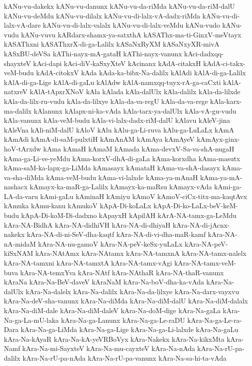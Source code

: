 {kANu-vu-dakekx
kANu-vu-danunx
kANu-vu-da-riMda
kANu-vu-da-riM-dalU
kANu-vu-deMdu
kANu-vu-dilalx
kANu-vu-di-lalx-vA-dadx-riMda
kANu-vu-di-lalx-vA-dare
kANu-vu-di-lalx-valalx
kANu-vu-di-lalx-veMdu
kANu-vudo
kANu-vudu
kANu-vuvu
kARdarx-shamx-ya-satxthA
kASAThx-ma-ti-GinxV-meVtayx
kASAThxni
kASAThxrX-di-ga-Lalilx
kASaNxRyXM
kASaNxyXR-mivA
kASxBU-deVSa
kAThi-nayx-mA-gataH
kAThi-nayx-vanunx
kAci-dadxqq-shayxteV
kAci-dapi
kAci-diV-kaSxyXteV
kAcinanx
kAdA-citakxH
kAdA-ci-takx-veM-budu
kAdA-citokxV
kAda
kAda-ka-bibx-Na-dalilx
kAlAdi
kAlA-di-ga-Lalilx
kAlA-di-ga-Lige
kAlA-di-gaLu
kAlAdw
kAlA-namxqq-tuyx-rA-ga-caCxti
kAlA-natxreV
kAlA-tApxrXNoV
kAla
kAlada
kAla-dalUlx
kAla-dalilx
kAla-da-lilxde
kAla-da-lilx-ru-vudu
kAla-da-lilxye
kAla-da-va-regU
kAla-da-va-rege
kAla-karx-ma-dalilx
kAlanunx
kAlapx-ni-ka-vAda
kAla-tarx-ya-dalUlx
kAla-vA-gu-vudu
kAla-vanunx
kAla-veM-budu
kAla-vi-lalx-dadx-riM-dalU
kAlavu
kAleV-jina
kAleVna
kAli-niM-dalU
kAloV
kAlu
kAlu-ga-Li-ruva
kAlu-ga-LuLaLx
kAmA
kAmAdi
kAmA-di-saM-pulxtiH
kAmAnAM
kAmAya
kAmAyeV
kAmAyx-ginx-hoV-tArxdw
kAma
kAmaH
kAmaM
kAmada
kAma-devxV-Sa-va-shA-nugaH
kAma-ga-Li-ve-yeMdu
kAma-korxV-dhA-di-gaLa
kAma-korxdha
kAma-masutx
kAma-saM-ka-lapx-ga-LiMda
kAmasayx
kAmataH
kAma-va-shA-dasayx
kAma-va-sha-diMda
kAma-veM-budu
kAma-vi-lalxde
kAma-ya-mAnaH
kAma-ya-mA-nashacx
kAmayx-ka-maR-ga-Lalilx
kAmayx-ka-maRsu
kAmayx-vAda
kAmi-ga-LA-da-varu
kAmi-gaLu
kAminaH
kAmiyu
kAmoV
kAmoV-ciCx-titx-ma-kaqtAvx
kAmuka
kAmu-kanu
kAmukoV
kApA-Di-koLaLx
kApA-Di-ko-LaLx-beV-keM-budu
kApA-Di-koM-Di-dadxno
kApayxH
kApilAH
kArA-NA-tamx-ga-LeMdu
kAra-NA-BidhA
kAra-NA-didhiVH
kAra-NA-di-dhiyaH
kAra-NA-di-jAcnx-nakekx
kAra-NA-di-ni-SeV-dha-kaqtf
kAra-NA-di-vi-dha-maR-kamf
kAra-NA-nA-midaM
kAra-NA-nu-gamoV
kAra-NA-peV-keSx-yuLaLx
kAra-NA-peV-kiSxNAM
kAra-NAtAmx
kAra-NAtamx
kAra-NA-tamxnA
kAra-NA-tamx-nalelx
kAra-NA-tamxni
kAra-NA-tamxtA
kAra-NA-tamx-vAgi
kAra-NA-tamx-veM-buva
kAra-NA-temxYva
kAra-NAtf
kAra-NAthaR
kAra-NA-thaR-vanunx
kAraNa
kAra-Na-BeV-daveV
kAraNaM
kAra-Na-boV-dha-ka-vAda
kAra-Na-dalUlx
kAra-Na-dalelx
kAra-Na-dalilx
kAra-Na-da-lilxye
kAra-Na-darx-vayxvu
kAra-Na-deV-sha-vanunx
kAra-Na-diMda
kAra-Na-diM-dalU
kAra-Na-diM-dalalx
kAra-Na-diM-dale
kAra-Na-diM-daleV
kAra-Na-doM-dige
kAra-Na-gaLa
kAra-Na-ga-La-mU-laka
kAra-Na-ga-Lanunx
kAra-Na-ga-Le-raDU
kAra-Na-ga-Le-ra-Dara
kAra-Na-ga-LiMda
kAra-Na-ga-Lige
kAra-Na-ga-Li-lalxde
kAra-Na-gaLu
kAra-Na-kAyaR
kAra-Na-kA-yeVRBoVyx
kAra-Nakekx
kAra-Na-kikxMta
kAra-Namf
kAra-Na-mi-SayxteV
kAra-Na-mu-cayxteV
kAra-Na-nAda
kAra-Na-rU-pa-dalilx
kAra-Na-rU-pa-nAda
kAra-Na-rU-pa-vanunx
kAra-Na-sa-hi-ta-vAda
}
